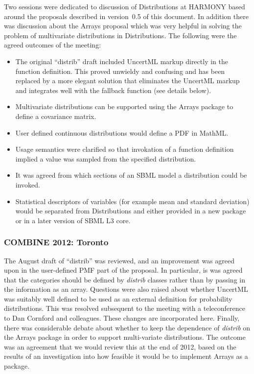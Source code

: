 \documentclass[draftspec]{sbmlpkgspec}
\newcommand{\arrays}{Arrays\xspace}
\newcommand{\distribshort}{\emph{distrib}\xspace}
\newcommand{\distrib}{Distributions\xspace}
\newcommand{\mathml}{MathML\xspace}
\newcommand{\uncertml}{UncertML\xspace}
\begin{document}
Two sessions were dedicated to discussion of \distrib at HARMONY based
around the proposals described in version~0.5 of this document. In
addition there was discussion about the \arrays proposal which was
very helpful in solving the problem of multivariate distributions in
\distrib. The following were the agreed outcomes of the meeting:

\begin{itemize}
\item The original ``distrib'' draft included UncertML markup directly in the
  function definition. This proved unwieldy and confusing and has been
  replaced by a more elegant solution that eliminates the UncertML
  markup and integrates well with the fallback function (see details
  below).
\item Multivariate distributions can be supported using the \arrays
  package to define a covariance matrix.
\item User defined continuous distributions would define a PDF in
  \mathml.
\item Usage semantics were clarified so that invokation of a function
  definition implied a value was sampled from the specified
  distribution.
\item It was agreed from which sections of an SBML model a
  distribution could be invoked.
\item Statistical descriptors of variables (for
  example mean and standard deviation) would be separated from
  \distrib and either provided in a new package or in a later version
  of SBML L3 core.
\end{itemize}

\subsubsection{COMBINE 2012: Toronto}

The August draft of ``distrib'' was reviewed, and an improvement was agreed upon in
the user-defined PMF part of the proposal. In particular, is was agreed
that the categories should be defined by \distribshort classes rather
than by passing in the information as an array. Questions were also raised
about whether \uncertml was suitably well defined to be used as an
external definition for probability distributions. This was resolved
subsequent to the meeting with a teleconference to Dan Cornford and
colleagues. These changes are incorporated here. Finally, there was
considerable debate about whether to keep the dependence of
\distribshort on the Arrays package in order to support multi-variate
distributions. The outcome was an agreement that we would review this
at the end of 2012, based on the results of an investigation
into how feasible it would be to implement \arrays as a package.
\end{document}
